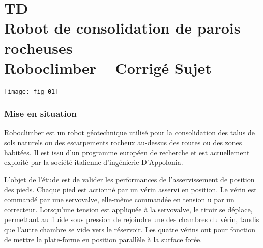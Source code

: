 \chapter*{TD  \\ 
Robot de consolidation de parois rocheuses \\  Roboclimber -- \ifprof Corrigé \else Sujet \fi}


\iflivret {} \else
\ifprof  {} \else \fi
\fi
\setcounter{question}{0}

\begin{marginfigure}
\centering
\texttt{[image: fig\_01]}
\end{marginfigure}


\subsection*{Mise en situation}
Roboclimber est un robot géotechnique utilisé pour la consolidation des talus de sols naturels
ou des escarpements rocheux au-dessus des routes ou des zones habitées. Il est
issu d’un programme européen de recherche et est actuellement exploité par la société italienne
d’ingénierie D’Appolonia.



L’objet de l’étude est de valider les performances de l’asservissement de position des pieds.
Chaque pied est actionné par un vérin asservi en position. Le vérin est commandé par une
servovalve, elle-même commandée en tension u par un correcteur. Lorsqu’une
tension est appliquée à la servovalve, le tiroir se déplace, permettant au fluide sous pression de
rejoindre une des chambres du vérin, tandis que l’autre chambre se vide vers le réservoir.
Les quatre vérins ont pour fonction de mettre la plate-forme en position parallèle à la surface
forée. 



